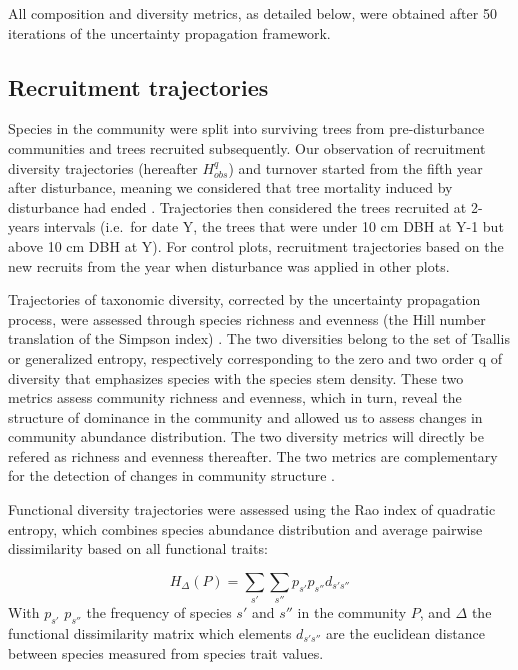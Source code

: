 \documentclass[fleqn,10pt]{ArtEcoFoG} %
\begin{document}
All composition and diversity metrics, as detailed below, were obtained after 50 iterations of the uncertainty propagation framework.

\hypertarget{recruitment-trajectories}{%
\subsection{Recruitment trajectories}\label{recruitment-trajectories}}

Species in the community were split into surviving trees from pre-disturbance communities and trees recruited subsequently. Our observation of recruitment diversity trajectories (hereafter \(H^q_{obs}\)) and turnover started from the fifth year after disturbance, meaning we considered that tree mortality induced by disturbance had ended \citep{Piponiot2016}. Trajectories then considered the trees recruited at 2-years intervals (i.e.~for date Y, the trees that were under 10 cm DBH at Y-1 but above 10 cm DBH at Y). For control plots, recruitment trajectories based on the new recruits from the year when disturbance was applied in other plots.

Trajectories of taxonomic diversity, corrected by the uncertainty propagation process, were assessed through species richness and evenness (the Hill number translation of the Simpson index) \citep{Chao2015, Marcon2015}.
The two diversities belong to the set of Tsallis or generalized entropy, respectively corresponding to the zero and two order q of diversity that emphasizes species with the species stem density. These two metrics assess community richness and evenness, which in turn, reveal the structure of dominance in the community and allowed us to assess changes in community abundance distribution.
The two diversity metrics will directly be refered as richness and evenness thereafter.
The two metrics are complementary for the detection of changes in community structure \citep{Magurran2004}.

Functional diversity trajectories were assessed using the Rao index of quadratic entropy, which combines species abundance distribution and average pairwise dissimilarity based on all functional traits:

\[H_\Delta(P) = \sum_{s'}\sum_{s''}p_{s'}p_{s''}d_{s's''}\]
With \(p_{s'}\) \(p_{s''}\) the frequency of species \(s'\) and \(s''\) in the community \(P\), and \(\Delta\) the functional dissimilarity matrix which elements \(d_{s's''}\) are the euclidean distance between species measured from species trait values.
\end{document}
